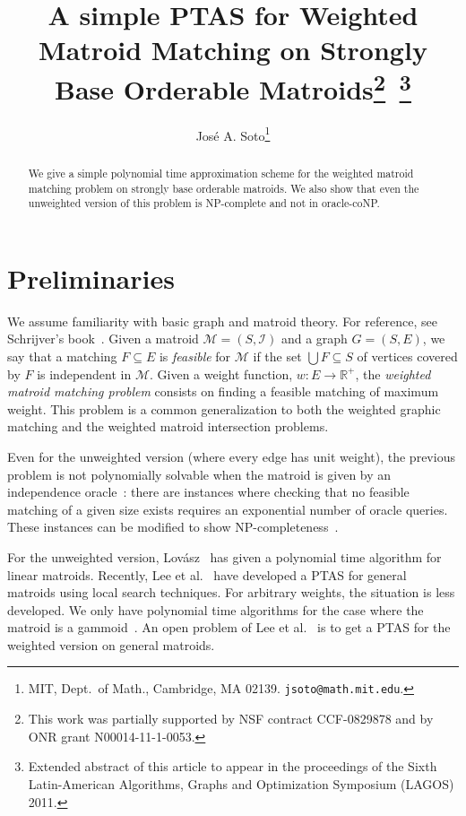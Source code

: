 \documentclass[letterpaper,11pt]{article}
\newcommand{\Real}{{\mathbb R}}
\newcommand{\NP}{{\textrm NP}}
\newcommand{\M}{\mathcal{M}}
\newcommand{\I}{\mathcal{I}}
\theoremstyle{definition}
\begin{document}
\title{A simple PTAS for Weighted Matroid Matching on Strongly Base Orderable Matroids\footnote{This work was partially supported by NSF
  contract CCF-0829878 and by ONR grant N00014-11-1-0053.}\, \footnote{Extended abstract of this article to appear in the proceedings of the Sixth Latin-American Algorithms, Graphs and Optimization Symposium (LAGOS) 2011.}}
\author{Jos\'e A. Soto\thanks{MIT,
Dept.~of Math., Cambridge, MA 02139. \texttt{jsoto@math.mit.edu}.}}
\date{}
\maketitle

\begin{abstract}
We give a simple polynomial time approximation scheme for the weighted matroid matching problem on strongly base orderable matroids. We also show that even the unweighted version of this problem is NP-complete and not in oracle-coNP.
\end{abstract}



\section{Preliminaries}
We assume familiarity with basic graph and matroid theory. For reference, see Schrijver's book~\cite{Schrijver-book}. Given a matroid $\M=(S,\I)$ and a graph $G=(S,E)$, we say that a matching $F \subseteq E$ is  \emph{feasible} for $\M$ if the set $\bigcup F \subseteq S$ of vertices covered by $F$ is independent in $\M$. Given a weight function, $w\colon E \to \Real^+$, the \emph{weighted matroid matching problem} consists on finding a feasible matching of maximum weight. This problem is a common generalization to both the weighted graphic matching and the weighted matroid intersection problems.

Even for the unweighted version (where every edge has unit weight), the previous problem is not polynomially solvable when the matroid is given by an independence oracle~\cite{JensenK82,Lovasz81}: there are instances where checking that no feasible matching of a given size exists requires an exponential number of oracle queries. These instances can be modified to show \NP-completeness~\cite{Schrijver-book}.

For the unweighted version, Lov\'asz~\cite{Lovasz81} has given a polynomial time algorithm for linear matroids. Recently, Lee et al.~\cite{LeeSV10} have developed a PTAS for general matroids using local search techniques. For arbitrary weights, the situation is less developed. We only have polynomial time algorithms for the case where the matroid is a gammoid~\cite{tong1982solving}. An open problem of Lee et al.~\cite{LeeSV10} is to get a PTAS for the weighted version on general matroids.
\end{document}
